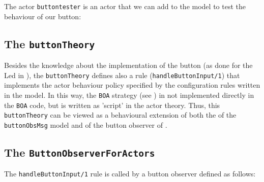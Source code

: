The actor \texttt{buttontester} is an actor that we can add to the model to test the behaviour of our button:



 
\subsection{The \texttt{buttonTheory} }

Besides the knowledge about the implementation of the button (as done for the Led in ), the \texttt{buttonTheory} defines also a rule (\texttt{handleButtonInput/1})  that implements the actor behaviour policy specified by the configuration rules written in the model.
In this way, the \texttt{BOA} strategy (see ) in not implemented directly in the \java{} \texttt{BOA} code, but is written as 'script' in the actor theory. Thus, this \texttt{buttonTheory} can be viewed as a behavioural extension of both the of the \texttt{buttonObsMsg} model and of the \java{} button observer of . 







\subsection{The \texttt{ButtonObserverForActors} }
The \texttt{handleButtonInput/1} rule is called by a \java{} button observer  defined as follows:



